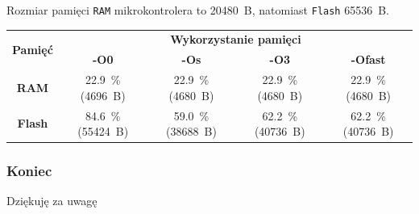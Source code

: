 \begin{frame}
			Rozmiar pamięci \texttt{RAM} mikrokontrolera to \SI{20480}{B}, natomiast \texttt{Flash} \SI{65536}{B}.
			\tiny
			\begin{table}
				\centering
				\begin{tabular}{|c|c|c|c|c|}
					\hline
					\multirow{ 2}{*}{\textbf{Pamięć}} & \multicolumn{4}{c|}{\textbf{Wykorzystanie pamięci}}     \\ \cline{2-5} 
					& \textbf{-O0} & \textbf{-Os}   & \textbf{-O3}   & \textbf{-Ofast}     \\ \hline \hline
					\textbf{RAM}         & \SI{22.9}{\percent} (\SI{4696}{B})   & \SI{22.9}{\percent} (\SI{4680}{B}) & \SI{22.9}{\percent} (\SI{4680}{B}) & \SI{22.9}{\percent} (\SI{4680}{B})     \\ \hline
					\textbf{Flash}           & \SI{84.6}{\percent} (\SI{55424}{B})    & \SI{59.0}{\percent} (\SI{38688}{B}) & \SI{62.2}{\percent} (\SI{40736}{B})  & \SI{62.2}{\percent} (\SI{40736}{B})     \\ \hline
				\end{tabular}
			\end{table}
		\end{frame}

	\begin{frame}
	\frametitle{Koniec}
	\centering
	Dziękuję za uwagę
\end{frame}


